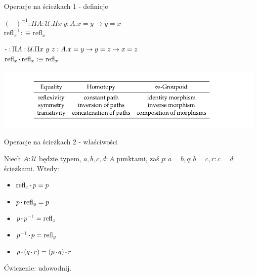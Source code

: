 \documentclass{beamer}
\newcommand{\defn}{:\equiv}
\newcommand{\U}{\mathcal{U}}
\newcommand{\refl}[1]{\text{refl}_{#1}}
\newcommand{\inv}[1]{#1^{-1}}
\newcommand{\sq}{\mathbin{\vcenter{\hbox{\rule{.3ex}{.3ex}}}}}
\begin{document}
\begin{frame}{Operacje na ścieżkach 1 - definicje}

\begin{definition}
$\inv{(-)} : \Pi A : \U. \Pi x\ y : A. x = y \to y = x$ \\
$\inv{\refl{x}} \defn \refl{x}$
\end{definition}

\begin{definition}
$\sq : \Pi A : \U. \Pi x\ y\ z : A. x = y \to y = z \to x = z$ \\
$\refl{x} \sq \refl{x} \defn \refl{x}$
\end{definition}

\includegraphics[scale=0.3]{EqPathGrupoid.png}

\end{frame}

\begin{frame}{Operacje na ścieżkach 2 - właściwości}

\begin{theorem}

Niech $A : \U$ będzie typem, $a, b, c, d : A$ punktami, zaś $p : a = b, q : b = c, r : c = d$ ścieżkami. Wtedy:

\begin{itemize}
	\item $\refl{x} \sq p = p$
	\item $p \sq \refl{y} = p$
	\item $p \sq \inv{p} = \refl{x}$
	\item $\inv{p} \sq p = \refl{y}$
	\item $p \sq (q \sq r) = (p \sq q) \sq r$
\end{itemize}

\end{theorem}

Ćwiczenie: udowodnij.

\end{frame}
\end{document}
